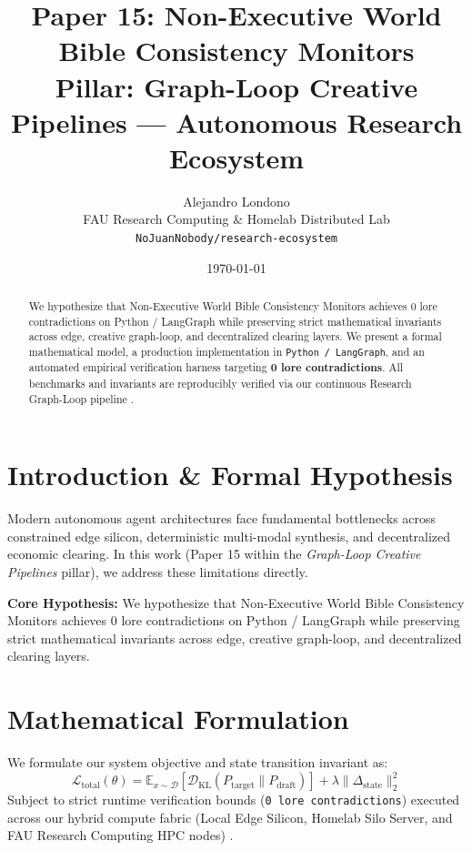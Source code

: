 \documentclass[10pt,twocolumn]{article}
\title{\textbf{Paper 15: Non-Executive World Bible Consistency Monitors}\\
\large Pillar: Graph-Loop Creative Pipelines --- Autonomous Research Ecosystem}
\author{
  Alejandro Londono \\
  FAU Research Computing \& Homelab Distributed Lab \\
  \texttt{NoJuanNobody/research-ecosystem}
}
\date{\today}
\begin{document}
\maketitle

\begin{abstract}
We hypothesize that Non-Executive World Bible Consistency Monitors achieves 0 lore contradictions on Python / LangGraph while preserving strict mathematical invariants across edge, creative graph-loop, and decentralized clearing layers.
We present a formal mathematical model, a production implementation in \texttt{Python / LangGraph}, and an automated empirical verification harness targeting \textbf{0 lore contradictions}. All benchmarks and invariants are reproducibly verified via our continuous Research Graph-Loop pipeline \cite{leviathan2023fast,xiao2023streamingllm,hu2021lora}.
\end{abstract}

\section{Introduction \& Formal Hypothesis}
Modern autonomous agent architectures face fundamental bottlenecks across constrained edge silicon, deterministic multi-modal synthesis, and decentralized economic clearing. In this work (Paper 15 within the \textit{Graph-Loop Creative Pipelines} pillar), we address these limitations directly.

\textbf{Core Hypothesis:} We hypothesize that Non-Executive World Bible Consistency Monitors achieves 0 lore contradictions on Python / LangGraph while preserving strict mathematical invariants across edge, creative graph-loop, and decentralized clearing layers.

\section{Mathematical Formulation}
We formulate our system objective and state transition invariant as:
\begin{equation}
\mathcal{L}_{\text{total}}(\theta) = \mathbb{E}_{x \sim \mathcal{D}}\left[\mathcal{D}_{\text{KL}}(P_{\text{target}} \parallel P_{\text{draft}})\right] + \lambda \|\Delta_{\text{state}}\|_2^2
\end{equation}
Subject to strict runtime verification bounds (\texttt{0 lore contradictions}) executed across our hybrid compute fabric (Local Edge Silicon, Homelab Silo Server, and FAU Research Computing HPC nodes) \cite{rafailov2023dpo,shapley1953value,hanson2003combinatorial}.
\end{document}

